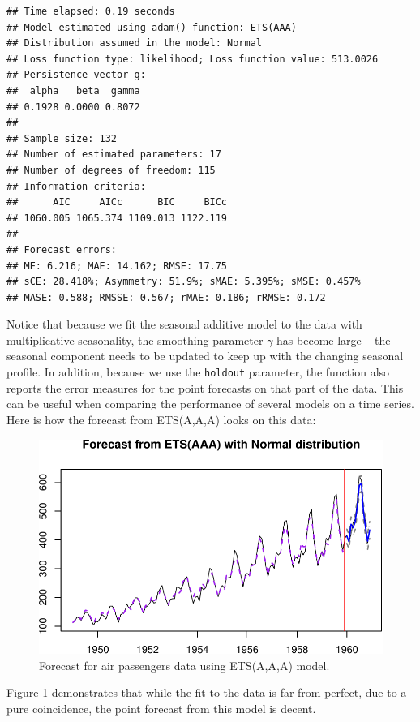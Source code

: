 \documentclass[
]{book}
\theoremstyle{definition}
\theoremstyle{definition}
\theoremstyle{definition}
\theoremstyle{definition}
\theoremstyle{remark}
\begin{document}
\begin{verbatim}
## Time elapsed: 0.19 seconds
## Model estimated using adam() function: ETS(AAA)
## Distribution assumed in the model: Normal
## Loss function type: likelihood; Loss function value: 513.0026
## Persistence vector g:
##  alpha   beta  gamma 
## 0.1928 0.0000 0.8072 
## 
## Sample size: 132
## Number of estimated parameters: 17
## Number of degrees of freedom: 115
## Information criteria:
##      AIC     AICc      BIC     BICc 
## 1060.005 1065.374 1109.013 1122.119 
## 
## Forecast errors:
## ME: 6.216; MAE: 14.162; RMSE: 17.75
## sCE: 28.418%; Asymmetry: 51.9%; sMAE: 5.395%; sMSE: 0.457%
## MASE: 0.588; RMSSE: 0.567; rMAE: 0.186; rRMSE: 0.172
\end{verbatim}

Notice that because we fit the seasonal additive model to the data with multiplicative seasonality, the smoothing parameter \(\gamma\) has become large -- the seasonal component needs to be updated to keep up with the changing seasonal profile. In addition, because we use the \texttt{holdout} parameter, the function also reports the error measures for the point forecasts on that part of the data. This can be useful when comparing the performance of several models on a time series. Here is how the forecast from ETS(A,A,A) looks on this data:

\begin{figure}
\centering
\includegraphics{Svetunkov--2022----ADAM_files/figure-latex/AirPassengersAAAForecast-1.pdf}
\caption{\label{fig:AirPassengersAAAForecast}Forecast for air passengers data using ETS(A,A,A) model.}
\end{figure}

Figure \ref{fig:AirPassengersAAAForecast} demonstrates that while the fit to the data is far from perfect, due to a pure coincidence, the point forecast from this model is decent.
\end{document}
